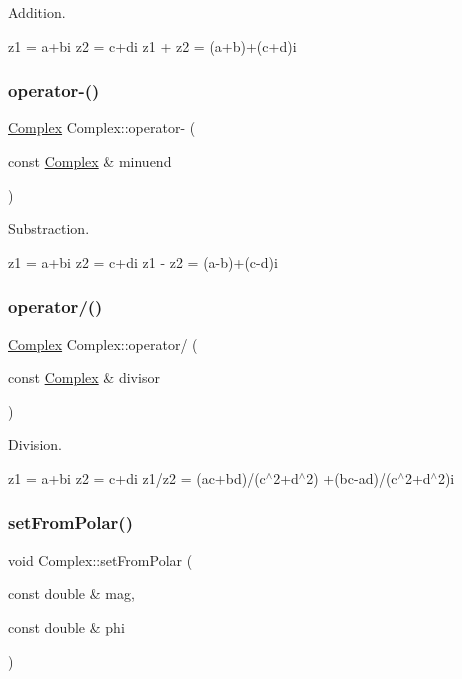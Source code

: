 Addition. 

z1 = a+bi z2 = c+di z1 + z2 = (a+b)+(c+d)i \mbox{\label{class_complex_a8f880f1056308d876fd50aad9244e8d2}} 
\subsubsection{\texorpdfstring{operator-\/()}{operator-()}}
{\footnotesize\ttfamily \mbox{\hyperlink{class_complex}{Complex}} Complex\+::operator-\/ (\begin{DoxyParamCaption}\item[{const \mbox{\hyperlink{class_complex}{Complex}} \&}]{minuend }\end{DoxyParamCaption})}



Substraction. 

z1 = a+bi z2 = c+di z1 -\/ z2 = (a-\/b)+(c-\/d)i \mbox{\label{class_complex_a365fd33e7bc67fde80e79c514aab95bc}} 
\subsubsection{\texorpdfstring{operator/()}{operator/()}}
{\footnotesize\ttfamily \mbox{\hyperlink{class_complex}{Complex}} Complex\+::operator/ (\begin{DoxyParamCaption}\item[{const \mbox{\hyperlink{class_complex}{Complex}} \&}]{divisor }\end{DoxyParamCaption})}



Division. 

z1 = a+bi z2 = c+di z1/z2 = (ac+bd)/(c$^\wedge$2+d$^\wedge$2) +(bc-\/ad)/(c$^\wedge$2+d$^\wedge$2)i \mbox{\label{class_complex_afc43a328b0288a31144aeaf4185b0d7d}} 
\subsubsection{\texorpdfstring{set\+From\+Polar()}{setFromPolar()}}
{\footnotesize\ttfamily void Complex\+::set\+From\+Polar (\begin{DoxyParamCaption}\item[{const double \&}]{mag,  }\item[{const double \&}]{phi }\end{DoxyParamCaption})}



